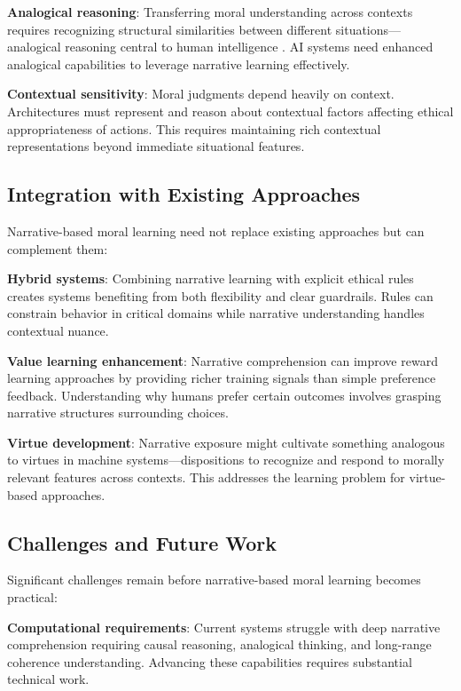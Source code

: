\documentclass[12pt]{article}
\begin{document}
\textbf{Analogical reasoning}: Transferring moral understanding across contexts requires recognizing structural similarities between different situations—analogical reasoning central to human intelligence \citep{gentner1983structure}. AI systems need enhanced analogical capabilities to leverage narrative learning effectively.

\textbf{Contextual sensitivity}: Moral judgments depend heavily on context. Architectures must represent and reason about contextual factors affecting ethical appropriateness of actions. This requires maintaining rich contextual representations beyond immediate situational features.

\subsection{Integration with Existing Approaches}

Narrative-based moral learning need not replace existing approaches but can complement them:

\textbf{Hybrid systems}: Combining narrative learning with explicit ethical rules creates systems benefiting from both flexibility and clear guardrails. Rules can constrain behavior in critical domains while narrative understanding handles contextual nuance.

\textbf{Value learning enhancement}: Narrative comprehension can improve reward learning approaches by providing richer training signals than simple preference feedback. Understanding why humans prefer certain outcomes involves grasping narrative structures surrounding choices.

\textbf{Virtue development}: Narrative exposure might cultivate something analogous to virtues in machine systems—dispositions to recognize and respond to morally relevant features across contexts. This addresses the learning problem for virtue-based approaches.

\subsection{Challenges and Future Work}

Significant challenges remain before narrative-based moral learning becomes practical:

\textbf{Computational requirements}: Current systems struggle with deep narrative comprehension requiring causal reasoning, analogical thinking, and long-range coherence understanding. Advancing these capabilities requires substantial technical work.
\end{document}
